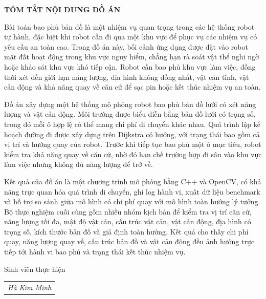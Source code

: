 \documentclass[../DoAn.tex]{subfiles}
\begin{document}
\begin{center}
    \Large{\textbf{TÓM TẮT NỘI DUNG ĐỒ ÁN}}\\
\end{center}
\vspace{1cm}

Bài toán bao phủ bản đồ là một nhiệm vụ quan trọng trong các hệ thống robot tự hành, đặc biệt khi robot cần đi qua một khu vực để phục vụ các nhiệm vụ có yêu cầu an toàn cao. Trong đồ án này, bối cảnh ứng dụng được đặt vào robot mặt đất hoạt động trong khu vực nguy hiểm, chẳng hạn rà soát vật thể nghi ngờ hoặc khảo sát khu vực khó tiếp cận. Robot cần bao phủ khu vực làm việc, đồng thời xét đến giới hạn năng lượng, địa hình không đồng nhất, vật cản tĩnh, vật cản động và khả năng quay về căn cứ để sạc pin hoặc kết thúc nhiệm vụ an toàn.

Đồ án xây dựng một hệ thống mô phỏng robot bao phủ bản đồ lưới có xét năng lượng và vật cản động. Môi trường được biểu diễn bằng bản đồ lưới có trọng số, trong đó mỗi ô hợp lệ có thể mang chi phí di chuyển khác nhau. Quá trình lập kế hoạch đường đi được xây dựng trên Dijkstra có hướng, với trạng thái bao gồm cả vị trí và hướng quay của robot. Trước khi tiếp tục bao phủ một ô mục tiêu, robot kiểm tra khả năng quay về căn cứ, nhờ đó hạn chế trường hợp đi sâu vào khu vực làm việc nhưng không đủ năng lượng để trở về.

Kết quả của đồ án là một chương trình mô phỏng bằng C++ và OpenCV, có khả năng trực quan hóa quá trình di chuyển, ghi log hành vi, xuất dữ liệu benchmark và hỗ trợ so sánh giữa mô hình có chi phí quay với mô hình toàn hướng lý tưởng. Bộ thực nghiệm cuối cùng gồm nhiều nhóm kịch bản để kiểm tra vị trí căn cứ, năng lượng tối đa, mật độ vật cản, cấu trúc vật cản, vật cản động, địa hình có trọng số, kích thước bản đồ và giả định toàn hướng. Kết quả cho thấy chi phí quay, năng lượng quay về, cấu trúc bản đồ và vật cản động đều ảnh hưởng trực tiếp tới hành vi bao phủ và trạng thái kết thúc nhiệm vụ.

\begin{flushright}
Sinh viên thực hiện\\
\begin{tabular}{@{}c@{}}
\textit{Hà Kim Minh}
\end{tabular}
\end{flushright}
\end{document}
